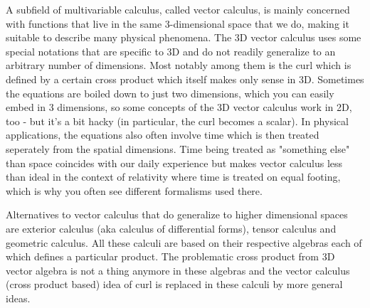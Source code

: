 \medskip
A subfield of multivariable calculus, called vector calculus, is mainly concerned with functions that live in the same 3-dimensional space that we do, making it suitable to describe many physical phenomena. The 3D vector calculus uses some special notations that are specific to 3D and do not readily generalize to an arbitrary number of dimensions. Most notably among them is the curl which is defined by a certain cross product which itself makes only sense in 3D. Sometimes the equations are boiled down to just two dimensions, which you can easily embed in 3 dimensions, so some concepts of the 3D vector calculus  work in 2D, too - but it's a bit hacky (in particular, the curl becomes a scalar). In physical applications, the equations also often involve time which is then treated seperately from the spatial dimensions. Time being treated as "something else" than space coincides with our daily experience but makes vector calculus less than ideal in the context of relativity where time is treated on equal footing, which is why you often see different formalisms used there. 

\medskip
Alternatives to vector calculus that do generalize to higher dimensional spaces are exterior calculus (aka calculus of differential forms), tensor calculus and geometric calculus. All these calculi are based on their respective algebras each of which defines a particular product. The problematic cross product from 3D vector algebra is not a thing anymore in these algebras and the vector calculus (cross product based) idea of curl is replaced in these calculi by more general ideas.



